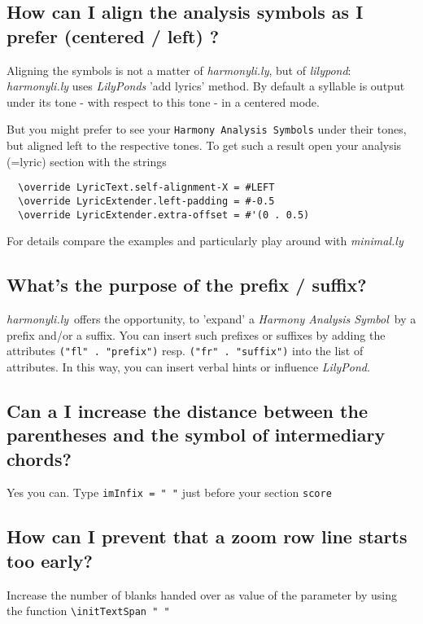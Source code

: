 \documentclass[
  DIV=calc,
  BCOR=5mm,
  12pt,
  headings=small,
  oneside,
  abstract=true,
  toc=bib,
  xcolor=dvipsnames,
  openany,
  english]{scrartcl}
\newcommand{\hlyn}[0]{\textit{harmonyli.ly}}
\newcommand{\lily}[0]{\textit{LilyPond}}
\newcommand{\has}[1]{\textit{Harmony Analysis Symbol#1}}
\begin{document}
\subsection{How can I align the analysis symbols as I prefer (centered / left) ?}
Aligning the symbols is not a matter of \textit{harmonyli.ly}, but of \textit{lilypond}:
\textit{harmonyli.ly} uses \textit{LilyPonds} 'add lyrics' method. By default a
syllable is output under its tone - with respect to this tone - in a centered mode.

But you might prefer to see your \texttt{Harmony Analysis Symbols} under their tones, 
but aligned left to the respective tones. To get such a result open your analysis (=lyric) 
section with the strings

\begin{verbatim}
  \override LyricText.self-alignment-X = #LEFT
  \override LyricExtender.left-padding = #-0.5
  \override LyricExtender.extra-offset = #'(0 . 0.5)
\end{verbatim}

For details compare the examples and particularly play around with \textit{minimal.ly}

\subsection{What's the purpose of the prefix / suffix?}

\hlyn\ offers the opportunity, to 'expand' a \has{}\ by a prefix and/or a
suffix. You can insert such prefixes or suffixes by adding the attributes
\texttt{("fl" . "prefix")} resp. \texttt{("fr" . "suffix")} into the list of
attributes. In this way, you can insert verbal hints or influence \lily.

\subsection{Can a I increase the distance between the parentheses and the symbol of intermediary chords?}

Yes you can. Type \texttt{imInfix = " "} just before your section \texttt{score}

\subsection{How can I prevent that a zoom row line starts too early?}

Increase the number of blanks handed over as value of the parameter by using the
function \texttt{\textbackslash initTextSpan "      "}
\end{document}
